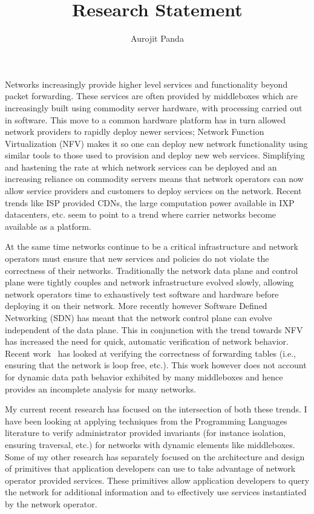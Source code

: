 \documentclass[letterpaper]{article}
\begin{document}
\title{\Large Research Statement}
\author{Aurojit Panda}
\date{}
\thispagestyle{empty}
\maketitle
Networks increasingly provide higher level services and functionality beyond packet forwarding. These services
are often provided by middleboxes which are increasingly built using commodity server hardware, with
processing carried out in software. This move to a common hardware platform has in turn allowed network
providers to rapidly deploy newer services; Network Function Virtualization (NFV) makes it so one can deploy
new network functionality using similar tools to those used to provision and deploy new web services.
Simplifying and hastening the rate at which network services can be deployed and an increasing reliance on
commodity servers means that network operators can now allow service providers and customers to deploy
services on the network. Recent trends like ISP provided CDNs, the large computation power available in IXP
datacenters, etc. seem to point to a trend where carrier networks become available as a platform.

At the same time networks continue to be a critical infrastructure and network operators must ensure that new
services and policies do not violate the correctness of their networks. Traditionally the network data plane
and control plane were tightly couples and network infrastructure evolved slowly, allowing network operators
time to exhaustively test software and hardware before deploying it on their network. More recently however
Software Defined Networking (SDN) has meant that the network control plane can evolve independent of the data
plane. This in conjunction with the trend towards NFV has increased the need for quick, automatic verification
of network behavior. Recent work~\cite{khurshid13veriflow, kazemian2012header} has looked at verifying the
correctness of forwarding tables (i.e., ensuring that the network is loop free, etc.). This work however does
not account for dynamic data path behavior exhibited by many middleboxes and hence provides an incomplete
analysis for many networks.

My current recent research has focused on the intersection of both these trends. I have been looking at applying
techniques from the Programming Languages literature to verify administrator provided invariants (for instance
isolation, ensuring traversal, etc.) for networks with dynamic elements like middleboxes. Some of my other
research has separately focused on the architecture and design of primitives that application developers can
use to take advantage of network operator provided services. These primitives allow application developers to
query the network for additional information and to effectively use services instantiated by the network
operator.
\end{document}
